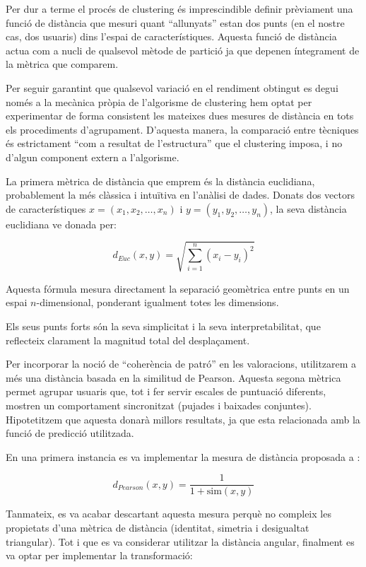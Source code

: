 \documentclass[a4paper,12pt]{report}
\begin{document}
Per dur a terme el procés de clustering és imprescindible definir prèviament una funció de distància que mesuri quant “allunyats” estan dos punts (en el nostre cas, dos usuaris) dins l’espai de característiques. Aquesta funció de distància actua com a nucli de qualsevol mètode de partició ja que depenen íntegrament de la mètrica que comparem.

Per seguir garantint que qualsevol variació en el rendiment obtingut es degui només a la mecànica pròpia de l’algorisme de clustering hem optat per experimentar de forma consistent les mateixes dues mesures de distància en tots els procediments d’agrupament. D’aquesta manera, la comparació entre tècniques és estrictament “com a resultat de l’estructura” que el clustering imposa, i no d’algun component extern a l’algorisme.

La primera mètrica de distància que emprem és la distància euclidiana, probablement la més clàssica i intuïtiva en l’anàlisi de dades. Donats dos vectors de característiques $x = (x_1, x_2, \ldots, x_n)$ i $y = (y_1, y_2, \ldots, y_n)$, la seva distància euclidiana ve donada per:

\[
d_{Euc}(x,y) = \sqrt{\sum_{i=1}^{n} (x_i - y_i)^2}
\]

Aquesta fórmula mesura directament la separació geomètrica entre punts en un espai $n$-dimensional, ponderant igualment totes les dimensions.

Els seus punts forts són la seva simplicitat i la seva interpretabilitat, que reflecteix clarament la magnitud total del desplaçament.

Per incorporar la noció de “coherència de patró” en les valoracions, utilitzarem a més una distància basada en la similitud de Pearson. 
Aquesta segona mètrica permet agrupar usuaris que, tot i fer servir escales de puntuació diferents, mostren un comportament sincronitzat (pujades i baixades conjuntes). 
Hipotetitzem que aquesta donarà millors resultats, ja que esta relacionada amb la funció de predicció utilitzada. 

En una primera instancia es va implementar la mesura de distància proposada a \cite{zahra2015novel}:

\[
d_{Pearson}(x,y) = \frac{1}{1 + \text{sim}(x,y)}
\]

Tanmateix, es va acabar descartant aquesta mesura perquè no compleix les propietats d’una mètrica de distància (identitat, simetria i desigualtat triangular).
Tot i que es va considerar utilitzar la distància angular, finalment es va optar per implementar la transformació:
\end{document}
